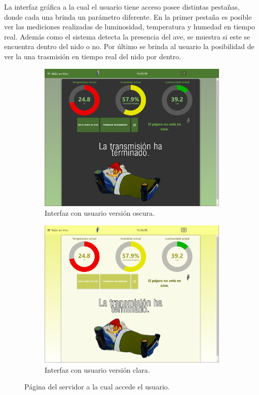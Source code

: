 La interfaz gráfica a la cual el usuario tiene acceso posee distintas pestañas, donde cada una brinda un parámetro diferente. En la primer pestaña es posible ver las mediciones realizadas de luminosidad, temperatura y humedad en tiempo real. Además como el sistema detecta la presencia del ave, se muestra si este se encuentra dentro del nido o no. Por último se brinda al usuario la posibilidad de ver la una trasmisión en tiempo real del nido por dentro.
\begin{figure}[H]
\centering
    	\begin{subfigure}{0.49\textwidth}
        	\centering
        	\includegraphics[width=\linewidth]{ImagenesIngenieria de Detalle/Node-Red-Live-Dark}		
			\caption{Interfaz con usuario versión oscura.}
			\label{fig:front_end_dark}
        \end{subfigure}\hfill
        \begin{subfigure}{0.49\textwidth}
        	\centering
        	\includegraphics[width=\linewidth]{ImagenesIngenieria de Detalle/Node-Red-Live-Light}				
        	\caption{Interfaz con usuario versión clara.}
			\label{fig:front_end_light}
        \end{subfigure}
	\caption{Página del servidor a la cual accede el usuario.}
	\label{fig:node_red_live}
\end{figure}


